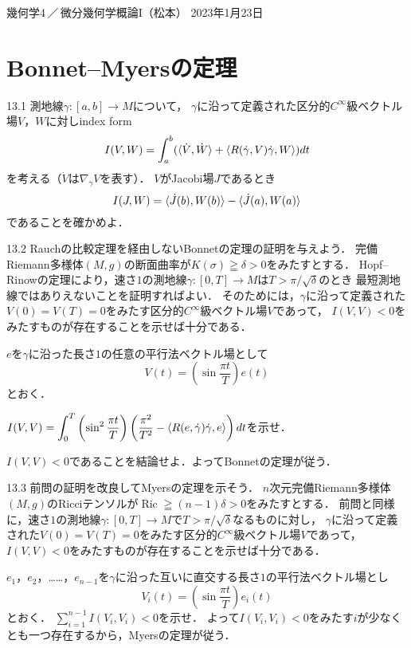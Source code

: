 \documentclass[uplatex,dvipdfmx,fontsize=12pt,jafontsize=11pt,line_length=42zw,number_of_lines=36,hanging_punctuation]{jlreq}
\DeclareMathOperator{\Ric}{Ric}
\begin{document}
\begin{flushleft}
	幾何学4\,／\,微分幾何学概論I（松本）
	\hfill
	2023年1月23日
\end{flushleft}
\setcounter{section}{12}
\section{Bonnet--Myersの定理}

\begin{enumerate-problems}
	\item[13.1]
		測地線$\gamma\colon[a,b]\to M$について，
		$\gamma$に沿って定義された区分的$C^\infty$級ベクトル場$V$，$W$に対しindex form
		\begin{equation}
			I(V,W)=\int_a^b(\braket{\dot{V},\dot{W}}+\braket{R(\dot{\gamma},V)\dot{\gamma},W})dt
		\end{equation}
		を考える（$\dot{V}$は$\nabla_{\dot{\gamma}}V$を表す）．
		$V$がJacobi場$J$であるとき
		\begin{equation}
			I(J,W)=\braket{\dot{J}(b),W(b)}-\braket{\dot{J}(a),W(a)}
		\end{equation}
		であることを確かめよ．
	\item[13.2]
		Rauchの比較定理を経由しないBonnetの定理の証明を与えよう．
		完備Riemann多様体$(M,g)$の断面曲率が$K(\sigma)\geqq\delta>0$をみたすとする．
		Hopf--Rinowの定理により，速さ$1$の測地線$\gamma\colon[0,T]\to M$は$T>\pi/\sqrt{\delta}$のとき
		最短測地線ではありえないことを証明すればよい．
		そのためには，$\gamma$に沿って定義された$V(0)=V(T)=0$をみたす区分的$C^\infty$級ベクトル場$V$であって，
		$I(V,V)<0$をみたすものが存在することを示せば十分である．

		$e$を$\gamma$に沿った長さ$1$の任意の平行法ベクトル場として
		\begin{equation}
			V(t)=\left(\sin\frac{\pi t}{T}\right)e(t)
		\end{equation}
		とおく．
		\begin{subproblems}
			\item
				$\displaystyle I(V,V)=\int_0^T\left(\sin^2\frac{\pi t}{T}\right)
				\left(\frac{\pi^2}{T^2}-\braket{R(e,\dot{\gamma})\dot{\gamma},e}\right)dt$を示せ．
			\item
				$I(V,V)<0$であることを結論せよ．よってBonnetの定理が従う．
		\end{subproblems}
	\item[13.3]
		前問の証明を改良してMyersの定理を示そう．
		$n$次元完備Riemann多様体$(M,g)$のRicciテンソルが$\Ric\geqq(n-1)\delta>0$をみたすとする．
		前問と同様に，速さ$1$の測地線$\gamma\colon[0,T]\to M$で$T>\pi/\sqrt{\delta}$なるものに対し，
		$\gamma$に沿って定義された$V(0)=V(T)=0$をみたす区分的$C^\infty$級ベクトル場$V$であって，
		$I(V,V)<0$をみたすものが存在することを示せば十分である．

		$e_1$，$e_2$，……，$e_{n-1}$を$\gamma$に沿った互いに直交する長さ$1$の平行法ベクトル場とし
		\begin{equation}
			V_i(t)=\left(\sin\frac{\pi t}{T}\right)e_i(t)
		\end{equation}
		とおく．
		$\displaystyle\sum_{i=1}^{n-1}I(V_i,V_i)<0$を示せ．
		よって$I(V_i,V_i)<0$をみたす$i$が少なくとも一つ存在するから，Myersの定理が従う．
\end{enumerate-problems}
\end{document}

